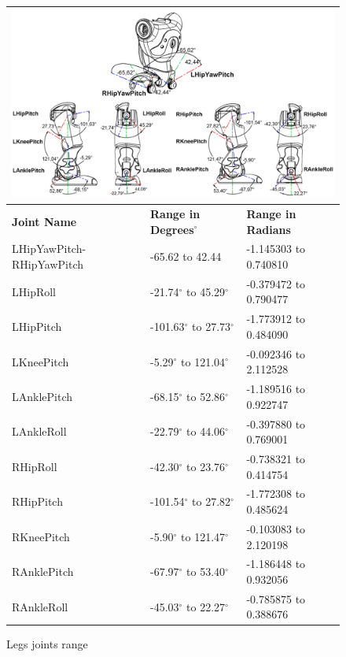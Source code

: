 \begin{figure}
\begin{tabular}{|p{5cm}|p{5cm}|p{5cm}|}
\multicolumn{3}{p{15cm}}{\centering \includegraphics[width = 15cm]{Figures/legsjoints.png}} \\ \hline
\textbf{Joint Name} & \textbf{Range in Degrees$^{\circ}$} & \textbf{Range in Radians} \\ \hline
LHipYawPitch-RHipYawPitch & -65.62 to 42.44 & -1.145303 to 0.740810 \\ \hline
LHipRoll & -21.74$^{\circ}$ to 45.29$^{\circ}$ & -0.379472 to 0.790477 \\ \hline
LHipPitch & -101.63$^{\circ}$ to 27.73$^{\circ}$ & -1.773912 to 0.484090 \\ \hline
LKneePitch & -5.29$^{\circ}$ to 121.04$^{\circ}$ & -0.092346 to 2.112528 \\ \hline
LAnklePitch & -68.15$^{\circ}$ to 52.86$^{\circ}$ & -1.189516 to 0.922747 \\ \hline
LAnkleRoll & -22.79$^{\circ}$ to 44.06$^{\circ}$ & -0.397880 to 0.769001 \\ \hline
RHipRoll & -42.30$^{\circ}$ to 23.76$^{\circ}$ & -0.738321 to 0.414754 \\ \hline
RHipPitch & -101.54$^{\circ}$ to 27.82$^{\circ}$ & -1.772308 to 0.485624 \\ \hline
RKneePitch & -5.90$^{\circ}$ to 121.47$^{\circ}$ & -0.103083 to 2.120198 \\ \hline
RAnklePitch & -67.97$^{\circ}$ to 53.40$^{\circ}$ & -1.186448 to 0.932056 \\ \hline
RAnkleRoll & -45.03$^{\circ}$ to 22.27$^{\circ}$ & -0.785875 to 0.388676 \\ \hline
\end{tabular}
\caption{Legs joints range}
\label{fig:ljoints}
\end{figure}

